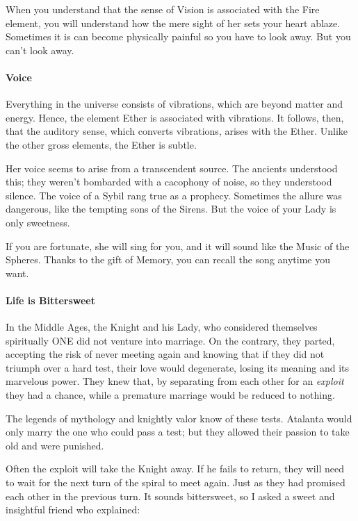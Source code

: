 When you understand that the sense of Vision is associated with the Fire element, you will understand how the mere sight of her sets your heart ablaze. Sometimes it is can become physically painful so you have to look away. But you can't look away.

\paragraph{Voice}
Everything in the universe consists of vibrations, which are beyond matter and energy. Hence, the element Ether is associated with vibrations. It follows, then, that the auditory sense, which converts vibrations, arises with the Ether. Unlike the other gross elements, the Ether is subtle.

Her voice seems to arise from a transcendent source. The ancients understood this; they weren't bombarded with a cacophony of noise, so they understood silence. The voice of a Sybil rang true as a prophecy. Sometimes the allure was dangerous, like the tempting sons of the Sirens. But the voice of your Lady is only sweetness.

If you are fortunate, she will sing for you, and it will sound like the Music of the Spheres. Thanks to the gift of Memory, you can recall the song anytime you want.

\paragraph{Life is Bittersweet}
\begin{quotex}
In the Middle Ages, the Knight and his Lady, who considered themselves spiritually ONE did not venture into marriage. On the contrary, they parted, accepting the risk of never meeting again and knowing that if they did not triumph over a hard test, their love would degenerate, losing its meaning and its marvelous power. They knew that, by separating from each other for an \emph{exploit} they had a chance, while a premature marriage would be reduced to nothing. 
\end{quotex}

The legends of mythology and knightly valor know of these tests. Atalanta would only marry the one who could pass a test; but they allowed their passion to take old and were punished.

Often the exploit will take the Knight away. If he fails to return, they will need to wait for the next turn of the spiral to meet again. Just as they had promised each other in the previous turn. It sounds bittersweet, so I asked a sweet and insightful friend who explained:

